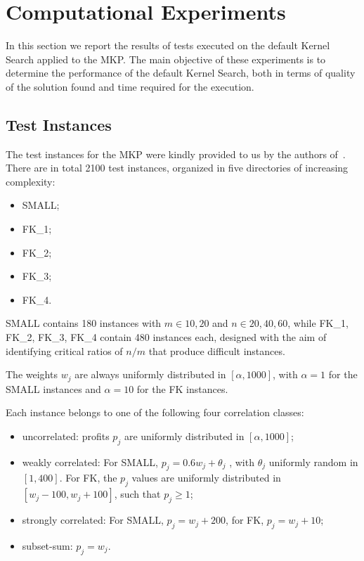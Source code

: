 \chapter{Computational Experiments}\label{ch:computational-experiments}
In this section we report the results of tests executed on the default Kernel Search applied to the MKP\@.
The main objective of these experiments is to determine the performance of the default Kernel Search,
both in terms of quality of the solution found and time required for the execution.


\section{Test Instances}
The test instances for the MKP were kindly provided to us by the authors of~\cite{mkp:2019}.\\
There are in total 2100 test instances, organized in
five directories of increasing complexity:
\begin{itemize}
    \item SMALL;
    \item FK\_1;
    \item FK\_2;
    \item FK\_3;
    \item FK\_4.
\end{itemize}
SMALL contains 180 instances with \(m \in {10,20} \) and
\(n \in {20,40,60}\), while FK\_1, FK\_2, FK\_3, FK\_4 contain 480 
instances each, designed with the aim of identifying critical ratios of
\(n/m\) that produce difficult instances.

The weights \(w_{j}\) are always uniformly distributed in \([\alpha, 1000]\), with \(\alpha = 1\) for the
SMALL instances and \(\alpha = 10\) for the FK instances.

Each instance belongs to one of the following four correlation classes:
\begin{itemize}
    \item uncorrelated: profits \(p_{j}\) are uniformly distributed in \([\alpha,1000]\);
    \item weakly correlated: For SMALL, \(p_{j} = 0.6 w_{j} + \theta_{j}\) , with \(\theta_{j}\) uniformly random in \([1, 400]\). For FK, the \(p_{j}\) values are uniformly distributed in \([w_{j} - 100, w_{j} + 100]\), such that \(p_{j} \geq 1\);
    \item strongly correlated: For SMALL, \(p_{j} = w_{j} + 200\), for FK, \(p_{j} = w_{j} + 10\);
    \item subset-sum: \(p_{j} = w_{j}\).
\end{itemize}

